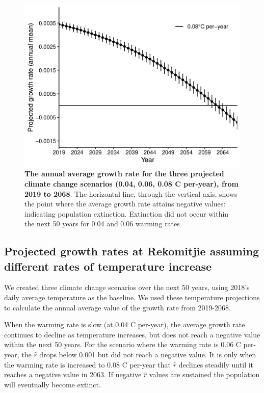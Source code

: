 \documentclass[12pt,a4paper]{article}
\begin{document}
\begin{figure}[h]
	\centering
	\includegraphics[width=0.8\linewidth]{ProjectionwithErrBar}
\caption{{\bf The annual average growth rate for the three projected climate change scenarios (0.04, 0.06, 0.08 \degree C per-year), from 2019 to 2068}. The horizontal line, through the vertical axis, shows the point where the average growth rate attains negative values: indicating population extinction. Extinction did not occur within the next 50 years for 0.04 and 0.06 warming rates}
	\label{fig:tsetseflowchat4}
\end{figure}

\subsection*{Projected growth rates at Rekomitjie assuming different rates of temperature increase}
We created three climate change scenarios over the next 50 years, using 2018's daily average temperature as the baseline. We used these temperature projections to calculate the annual average value of the growth rate from 2019-2068.

When the warming rate is slow (at 0.04 \textdegree C per-year), the average growth rate continues to decline as temperature increases, but does not reach a negative value within the next 50 years. For the scenario where the warming rate is 0.06 \textdegree C per-year, the $\hat{r}$ drops below 0.001 but did not reach a negative value. It is only when the warming rate is increased to 0.08 \textdegree C per-year that $\hat{r}$ declines steadily until it reaches a negative value in 2063. If negative $\hat{r}$ values are sustained the population will eventually become extinct.

 
\end{document}
